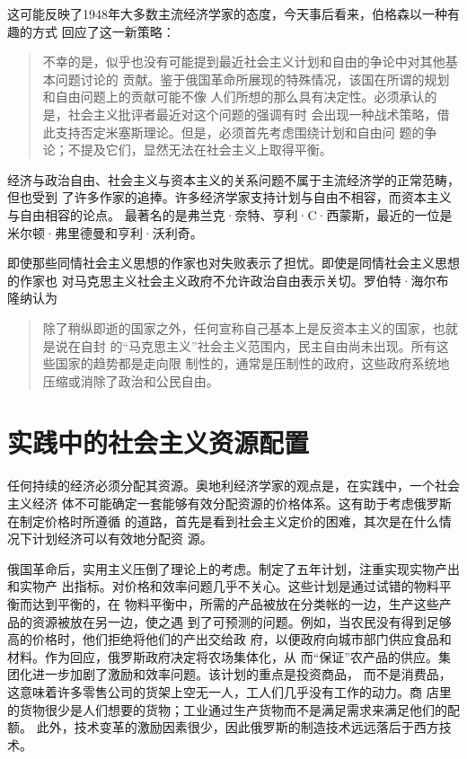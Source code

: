 这可能反映了1948年大多数主流经济学家的态度，今天事后看来，伯格森以一种有趣的方式
回应了这一新策略：

\begin{quotation}
  不幸的是，似乎也没有可能提到最近社会主义计划和自由的争论中对其他基本问题讨论的
  贡献。鉴于俄国革命所展现的特殊情况，该国在所谓的规划和自由问题上的贡献可能不像
  人们所想的那么具有决定性。必须承认的是，社会主义批评者最近对这个问题的强调有时
  会出现一种战术策略，借此支持否定米塞斯理论。但是，必须首先考虑围绕计划和自由问
  题的争论；不提及它们，显然无法在社会主义上取得平衡。
\end{quotation}

经济与政治自由、社会主义与资本主义的关系问题不属于主流经济学的正常范畴，但也受到
了许多作家的追捧。许多经济学家支持计划与自由不相容，而资本主义与自由相容的论点。
最著名的是弗兰克·奈特、亨利·C·西蒙斯，最近的一位是米尔顿·弗里德曼和亨利·沃利奇。

即使那些同情社会主义思想的作家也对失败表示了担忧。即使是同情社会主义思想的作家也
对马克思主义社会主义政府不允许政治自由表示关切。罗伯特·海尔布隆纳认为
\begin{quotation}
  除了稍纵即逝的国家之外，任何宣称自己基本上是反资本主义的国家，也就是说在自封
  的“马克思主义”社会主义范围内，民主自由尚未出现。所有这些国家的趋势都是走向限
  制性的，通常是压制性的政府，这些政府系统地压缩或消除了政治和公民自由。
\end{quotation}

\section{实践中的社会主义资源配置}

任何持续的经济必须分配其资源。奥地利经济学家的观点是，在实践中，一个社会主义经济
体不可能确定一套能够有效分配资源的价格体系。这有助于考虑俄罗斯在制定价格时所遵循
的道路，首先是看到社会主义定价的困难，其次是在什么情况下计划经济可以有效地分配资
源。

俄国革命后，实用主义压倒了理论上的考虑。制定了五年计划，注重实现实物产出和实物产
出指标。对价格和效率问题几乎不关心。这些计划是通过试错的物料平衡而达到平衡的，在
物料平衡中，所需的产品被放在分类帐的一边，生产这些产品的资源被放在另一边，使之遇
到了可预测的问题。例如，当农民没有得到足够高的价格时，他们拒绝将他们的产出交给政
府，以便政府向城市部门供应食品和材料。作为回应，俄罗斯政府决定将农场集体化，从
而“保证”农产品的供应。集团化进一步加剧了激励和效率问题。该计划的重点是投资商品，
而不是消费品，这意味着许多零售公司的货架上空无一人，工人们几乎没有工作的动力。商
店里的货物很少是人们想要的货物；工业通过生产货物而不是满足需求来满足他们的配额。
此外，技术变革的激励因素很少，因此俄罗斯的制造技术远远落后于西方技术。

